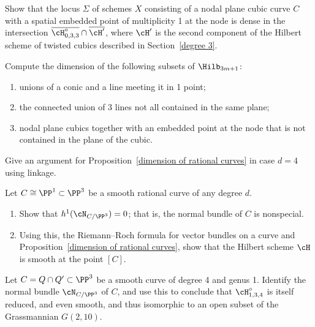 \begin{exercise}\label{hilb intersection}
Show that the locus $\Sigma$ of schemes $X$ consisting of a nodal plane
cubic curve $C$ with a spatial embedded point of multiplicity 1 at the
node is dense in the intersection $\overline{\cH^\circ_{0,3,3}} \cap
\overline{\cH'}$, where $\cH'$ is the second component of the Hilbert
scheme of twisted cubics described in Section~\ref{degree 3}.
\end{exercise}

\begin{exercise}
 Compute the dimension of the following subsets of $\Hilb_{3m+1}$:
%

\begin{enumerate}
 \item unions of a conic and a line meeting it in 1 point;
 \item the connected union of 3 lines not all contained in the same plane;
 \item nodal plane cubics together with an embedded point at the node
 that is not contained in the plane of
 the cubic.
\end{enumerate}
\end{exercise}

\begin{exercise}
Give an argument for Proposition~\ref{dimension of rational curves}
in case $d=4$ using linkage.
\end{exercise}

\begin{exercise}
Let $C \cong \PP^1 \subset \PP^3$ be a
smooth rational curve
 of any
%
degree $d$.
\begin{enumerate}
\item Show that $h^1(\cN_{C/\PP^3}) = 0$; that is, the normal bundle of
$C$ is nonspecial.
\item Using this, the
Riemann--Roch formula
%
for vector bundles on a curve
and Proposition~\ref{dimension of rational curves}, show that the Hilbert
scheme $\cH$ is smooth at the point $[C]$.
\end{enumerate}
\end{exercise}

\begin{exercise}\label{hilb 1,3,4}
Let $C = Q \cap Q' \subset \PP^3$ be a smooth curve of degree 4 and genus
1. Identify the normal bundle $\cN_{C/\PP^3}$ of $C$, and use this to
conclude that $\cH^\circ_{1,3,4}$ is itself reduced, and even smooth,
%
and thus isomorphic to an open subset of the Grassmannian $G(2,10)$.
\end{exercise}

